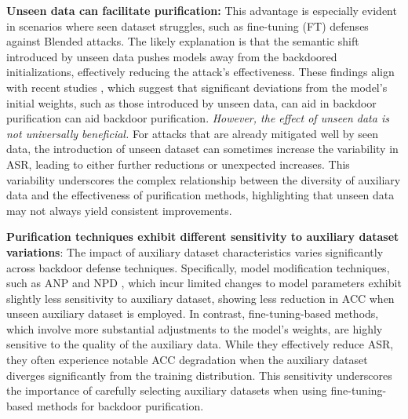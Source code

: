  \textbf{Unseen data can facilitate purification:} This advantage is especially evident in scenarios where seen dataset struggles, such as fine-tuning (FT) defenses against Blended attacks. The likely explanation is that the semantic shift introduced by unseen data pushes models away from the backdoored initializations, effectively reducing the attack’s effectiveness. These findings align with recent studies \citep{Zhu_2023_ICCV, wei2024backdoor}, which suggest that significant deviations from the model’s initial weights, such as those introduced by unseen data, can aid in backdoor purification can aid backdoor purification.  
%
\emph{However, the effect of unseen data is not universally beneficial.} For attacks that are already mitigated well by seen data, the introduction of unseen dataset can sometimes increase the variability in ASR,  leading to either further reductions or unexpected increases. This variability underscores the complex relationship between the diversity of auxiliary data and the effectiveness of purification methods, highlighting that unseen data may not always yield consistent improvements.

 \textbf{Purification techniques exhibit different sensitivity to auxiliary dataset variations}: The impact of auxiliary dataset characteristics varies significantly across backdoor defense techniques. Specifically, model modification techniques, such as ANP  \cite{wu2021adversarial} and NPD  \cite{zhu2023neural}, which incur limited changes to model parameters exhibit slightly less sensitivity to auxiliary dataset, showing less reduction in ACC when unseen auxiliary dataset is employed. In contrast, fine-tuning-based methods, which involve more substantial adjustments to the model's weights, are highly sensitive to the quality of the auxiliary data.  While they effectively reduce ASR,  they often experience notable ACC degradation when the auxiliary dataset diverges significantly from the training distribution. This sensitivity underscores the importance of carefully selecting auxiliary datasets when using fine-tuning-based methods for backdoor purification.




